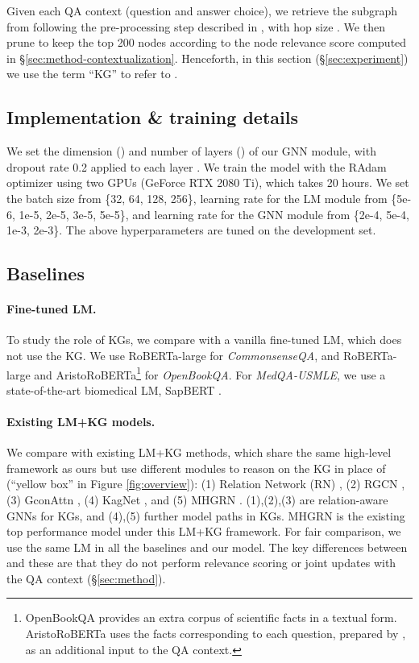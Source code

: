 Given each QA context (question and answer choice), we retrieve the subgraph  from  following the pre-processing step described in \citet{feng2020scalable}, with hop size . We then prune  to keep the top 200 nodes according to the node relevance score computed in \S \ref{sec:method-contextualization}.
Henceforth, in this section (\S \ref{sec:experiment}) we use the term ``KG'' to refer to .




\subsection{Implementation \& training details}
We set the dimension () and number of layers () of our GNN module, with dropout rate
0.2 applied to each layer \cite{srivastava2014dropout}. 
We train the model with the RAdam \cite{liu2019variance} optimizer using two GPUs (GeForce RTX 2080 Ti), which takes 20 hours.
We set the batch size from \{32, 64, 128, 256\}, learning rate for the LM module from \{5e-6, 1e-5, 2e-5, 3e-5, 5e-5\}, and learning rate for the GNN module from \{2e-4, 5e-4, 1e-3, 2e-3\}. The above hyperparameters are tuned on the development set.


\subsection{Baselines}
\label{sec:experiment-baseline}
\paragraph{Fine-tuned LM.}
To study the role of KGs, we compare with a vanilla fine-tuned LM, which does not use the KG. We use RoBERTa-large \cite{liu2019roberta} for \textit{CommonsenseQA}, and RoBERTa-large and AristoRoBERTa\footnote{OpenBookQA provides an extra corpus of scientific {facts} in a textual form. AristoRoBERTa uses the facts corresponding to each question, prepared by \citet{clark2019f}, as an additional input to the QA context.\vspace{-0mm}} \cite{clark2019f} for \textit{OpenBookQA}.
For \textit{MedQA-USMLE}, we use a state-of-the-art biomedical LM, SapBERT \cite{liu2020self}.


\paragraph{Existing LM+KG models.}
We compare with existing LM+KG methods, which share the same high-level framework as ours but use different modules to reason on the KG in place of \methodname (``yellow box'' in Figure\! \ref{fig:overview}):
(1) Relation Network (RN) \cite{santoro2017simple}, (2) RGCN \cite{schlichtkrull2018modeling}, (3) GconAttn \cite{wang2019improving}, (4) KagNet \cite{lin2019kagnet}, and (5) MHGRN \cite{feng2020scalable}.
(1),(2),(3) are relation-aware GNNs for KGs, and (4),(5) further model paths in KGs. MHGRN is the existing top performance model under this LM+KG framework.
For fair comparison, we use the same LM in all the baselines and our model.
The key differences between \methodname and these are that they do not perform {relevance scoring} or {joint updates} with the QA context (\S \ref{sec:method}).



